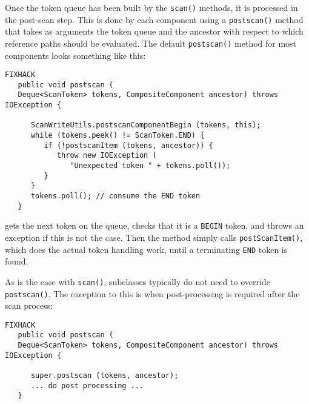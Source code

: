 \documentclass{article}
\begin{document}
Once the token queue has been built by the {\tt scan()} methods, it is
processed in the post-scan step. This is done by each component using
a {\tt postscan()} method that takes as arguments the token queue and
the ancestor with respect to which reference paths should be
evaluated. The default {\tt postscan()} method for most components
looks something like this:
\begin{lstlisting}FIXHACK
   public void postscan (
   Deque<ScanToken> tokens, CompositeComponent ancestor) throws IOException {

      ScanWriteUtils.postscanComponentBegin (tokens, this);
      while (tokens.peek() != ScanToken.END) {
         if (!postscanItem (tokens, ancestor)) {
            throw new IOException (
               "Unexpected token " + tokens.poll());
         }
      }
      tokens.poll(); // consume the END token
   }   
\end{lstlisting}
gets the next token on the queue, checks that it is a {\tt BEGIN}
token, and throws an exception if this is not the case.  Then the
method simply calls {\tt postScanItem()}, which does the actual token
handling work, until a terminating {\tt END} token is found.

As is the case with {\tt scan()}, subclasses typically do not need
to override {\tt postscan()}. The exception to this is when
post-processing is required after the scan process:
\begin{lstlisting}FIXHACK
   public void postscan (
   Deque<ScanToken> tokens, CompositeComponent ancestor) throws IOException {

      super.postscan (tokens, ancestor);
      ... do post processing ...
   }    
\end{lstlisting}
\end{document}
